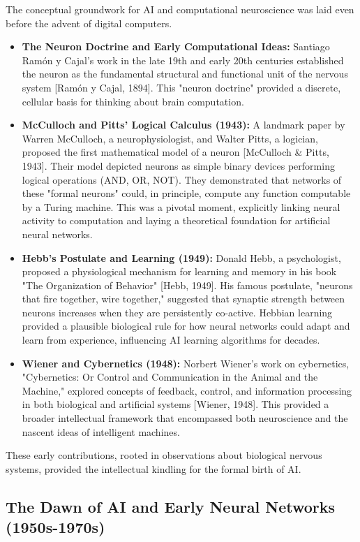 \documentclass[11pt,a4paper]{article}
\begin{document}
The conceptual groundwork for AI and computational neuroscience was laid even before the advent of digital computers.
\begin{itemize}
    \item \textbf{The Neuron Doctrine and Early Computational Ideas:} Santiago Ramón y Cajal's work in the late 19th and early 20th centuries established the neuron as the fundamental structural and functional unit of the nervous system [Ramón y Cajal, 1894]. This "neuron doctrine" provided a discrete, cellular basis for thinking about brain computation.
    \item \textbf{McCulloch and Pitts' Logical Calculus (1943):} A landmark paper by Warren McCulloch, a neurophysiologist, and Walter Pitts, a logician, proposed the first mathematical model of a neuron [McCulloch \& Pitts, 1943]. Their model depicted neurons as simple binary devices performing logical operations (AND, OR, NOT). They demonstrated that networks of these "formal neurons" could, in principle, compute any function computable by a Turing machine. This was a pivotal moment, explicitly linking neural activity to computation and laying a theoretical foundation for artificial neural networks.
    \item \textbf{Hebb's Postulate and Learning (1949):} Donald Hebb, a psychologist, proposed a physiological mechanism for learning and memory in his book "The Organization of Behavior" [Hebb, 1949]. His famous postulate, "neurons that fire together, wire together," suggested that synaptic strength between neurons increases when they are persistently co-active. Hebbian learning provided a plausible biological rule for how neural networks could adapt and learn from experience, influencing AI learning algorithms for decades.
    \item \textbf{Wiener and Cybernetics (1948):} Norbert Wiener's work on cybernetics, "Cybernetics: Or Control and Communication in the Animal and the Machine," explored concepts of feedback, control, and information processing in both biological and artificial systems [Wiener, 1948]. This provided a broader intellectual framework that encompassed both neuroscience and the nascent ideas of intelligent machines.
\end{itemize}
These early contributions, rooted in observations about biological nervous systems, provided the intellectual kindling for the formal birth of AI.

\subsection{The Dawn of AI and Early Neural Networks (1950s-1970s)}
\end{document}
